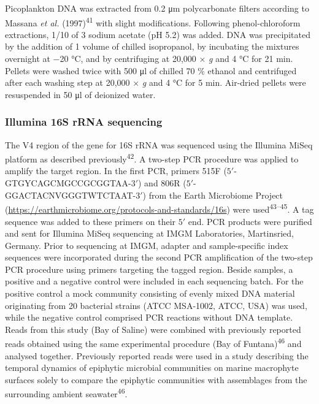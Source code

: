 \documentclass[
  12pt,
]{article}
\begin{document}
Picoplankton DNA was extracted from 0.2 \si{\um} polycarbonate filters
according to Massana \emph{et al.} (1997)\textsuperscript{41} with
slight modifications. Following phenol-chloroform extractions, 1/10 of 3
\si{\Molar} sodium acetate (pH 5.2) was added. DNA was precipitated by
the addition of 1 volume of chilled isopropanol, by incubating the
mixtures overnight at \num{-20} \si{\degreeCelsius}, and by centrifuging
at 20,000 × \emph{g} and 4 \si{\degreeCelsius} for 21 \si{\minute}.
Pellets were washed twice with 500 \si{\ul} of chilled 70 \si{\percent}
ethanol and centrifuged after each washing step at 20,000 × \emph{g} and
4 \si{\degreeCelsius} for 5 \si{\minute}. Air-dried pellets were
resuspended in 50 \si{\ul} of deionized water.

\hypertarget{illumina-16s-rrna-sequencing}{%
\subsubsection{Illumina 16S rRNA
sequencing}\label{illumina-16s-rrna-sequencing}}

The V4 region of the gene for 16S rRNA was sequenced using the Illumina
MiSeq platform as described previously\textsuperscript{42}. A two-step
PCR procedure was applied to amplify the target region. In the first
PCR, primers 515F (\(5'\)-GTGYCAGCMGCCGCGGTAA-\(3'\)) and 806R
(\(5'\)-GGACTACNVGGGTWTCTAAT-\(3'\)) from the Earth Microbiome Project
(\url{https://earthmicrobiome.org/protocols-and-standards/16s}) were
used\textsuperscript{43--45}. A tag sequence was added to these primers
on their \(5'\) end. PCR products were purified and sent for Illumina
MiSeq sequencing at IMGM Laboratories, Martinsried, Germany. Prior to
sequencing at IMGM, adapter and sample-specific index sequences were
incorporated during the second PCR amplification of the two-step PCR
procedure using primers targeting the tagged region. Beside samples, a
positive and a negative control were included in each sequencing batch.
For the positive control a mock community consisting of evenly mixed DNA
material originating from 20 bacterial strains (ATCC MSA-1002, ATCC,
USA) was used, while the negative control comprised PCR reactions
without DNA template. Reads from this study (Bay of Saline) were
combined with previously reported reads obtained using the same
experimental procedure (Bay of Funtana)\textsuperscript{46} and analysed
together. Previously reported reads were used in a study describing the
temporal dynamics of epiphytic microbial communities on marine
macrophyte surfaces solely to compare the epiphytic communities with
assemblages from the surrounding ambient seawater\textsuperscript{46}.
\end{document}

